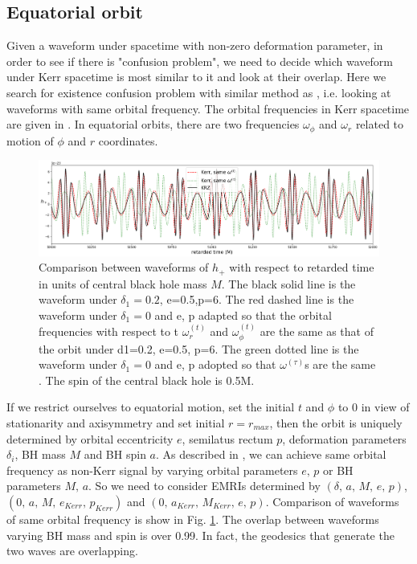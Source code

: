\documentclass{article}
\begin{document}
\subsection{Equatorial orbit}
\label{p_2d}
Given a waveform under spacetime with non-zero deformation parameter, in order to see if there is "confusion problem", we need to decide which waveform under Kerr spacetime is most similar to it and look at their overlap. Here we search for existence confusion problem with similar method as \cite{majorPRD}, i.e. looking at waveforms with same orbital frequency. The orbital frequencies in Kerr spacetime are given in \cite{tauOmg}. In equatorial orbits, there are two frequencies $\omega_\phi$ and $\omega_r$ related to motion of $\phi$ and $r$ coordinates.

\begin{figure}[!htb]
	\centering
	\includegraphics[width=16cm]{krz_kerr_wave.png}
	
	\caption{Comparison between waveforms of $h_+$ with respect to retarded time in units of central black hole mass $M$. The black solid line is the waveform under $\delta_1=0.2$, e=0.5,p=6. The red dashed line is the waveform under $\delta_1=0$ and e, p adapted so that the orbital frequencies with respect to t $\omega^{(t)}_r$ and $\omega^{(t)}_\phi$ are the same as that of the orbit under d1=0.2, e=0.5, p=6. The green dotted line is the waveform under $\delta_1 =0$ and e, p adopted so that $\omega^{(\tau)}$s are the same . The spin of the central black hole is 0.5M.}
	\label{kkwave}
\end{figure}	

If we restrict ourselves to equatorial motion, set the initial $t$ and $\phi$ to 0 in view of stationarity and axisymmetry and set initial $r=r_{max}$, then the orbit is uniquely determined by orbital eccentricity $e$, semilatus rectum $p$, deformation parameters $\delta_i$, BH mass $M$ and BH spin $a$. As described in \cite{majorPRD}, we can achieve same orbital frequency as non-Kerr signal by varying orbital parameters $e, \,p$ or BH parameters $M, \, a$. So we need to consider EMRIs determined by $(\delta,\, a,\, M,\, e,\, p)$, $(0,\, a,\, M,\, e_{Kerr},\, p_{Kerr})$ and $(0,\, a_{Kerr},\, M_{Kerr},\, e,\, p)$. Comparison of waveforms of same orbital frequency is show in Fig. \ref{kkwave}. The overlap between waveforms varying BH mass and spin is over 0.99. In fact, the geodesics that generate the two waves are overlapping.  
\end{document}
